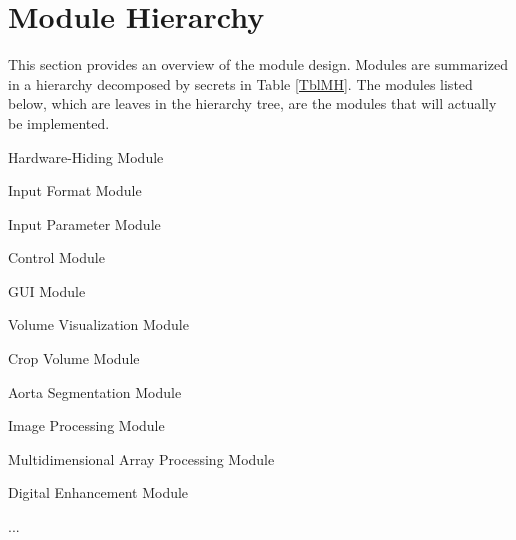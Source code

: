\documentclass[12pt, titlepage]{article}
\newcounter{mnum}
\newcommand{\mthemnum}{M\themnum}
\begin{document}
\section{Module Hierarchy} \label{SecMH}

This section provides an overview of the module design. Modules are summarized
in a hierarchy decomposed by secrets in Table \ref{TblMH}. The modules listed
below, which are leaves in the hierarchy tree, are the modules that will
actually be implemented.

\begin{description}
\item [ \mthemnum \label{mHH}:] Hardware-Hiding Module
\item [ \mthemnum \label{mInput}:] Input Format Module
\item [ \mthemnum \label{mParams}:] Input Parameter Module
\item [ \mthemnum \label{mControl}:] Control Module
\item [ \mthemnum \label{mGUI}:] GUI Module
\item [ \mthemnum \label{mVV}:] Volume Visualization Module
\item [ \mthemnum \label{mROI}:] Crop Volume Module
\item [ \mthemnum \label{mAortaSeg}:] Aorta Segmentation Module
\item [ \mthemnum \label{mIP}:] Image Processing Module
\item [ \mthemnum \label{mNDAP}:] Multidimensional Array Processing Module
\item [ \mthemnum \label{mDE}:] Digital Enhancement Module
\item ...
\end{description}
\end{document}
